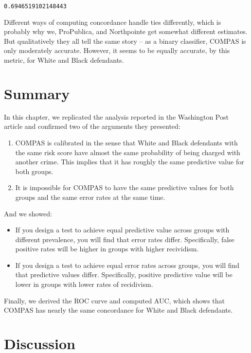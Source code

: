 \begin{lstlisting}[style=output]
0.6946519102148443
\end{lstlisting}

Different ways of computing concordance handle ties differently, which
is probably why we, ProPublica, and Northpointe get somewhat different
estimates. But qualitatively they all tell the same story -- as a binary
classifier, COMPAS is only moderately accurate. However, it seems to be
equally accurate, by this metric, for White and Black defendants.

\section{Summary}\label{summary}

In this chapter, we replicated the analysis reported in the Washington
Post article and confirmed two of the arguments they presented:

\begin{enumerate}
\def\labelenumi{\arabic{enumi}.}
\item
  COMPAS is calibrated in the sense that White and Black defendants with
  the same risk score have almost the same probability of being charged
  with another crime. This implies that it has roughly the same
  predictive value for both groups.
\item
  It is impossible for COMPAS to have the same predictive values for
  both groups and the same error rates at the same time.
\end{enumerate}

And we showed:

\begin{itemize}
\item
  If you design a test to achieve equal predictive value across groups
  with different prevalence, you will find that error rates differ.
  Specifically, false positive rates will be higher in groups with
  higher recividism.
\item
  If you design a test to achieve equal error rates across groups, you
  will find that predictive values differ. Specifically, positive
  predictive value will be lower in groups with lower rates of
  recidivism.
\end{itemize}

Finally, we derived the ROC curve and computed AUC, which shows that
COMPAS has nearly the same concordance for White and Black defendants.

\section{Discussion}\label{discussion}

